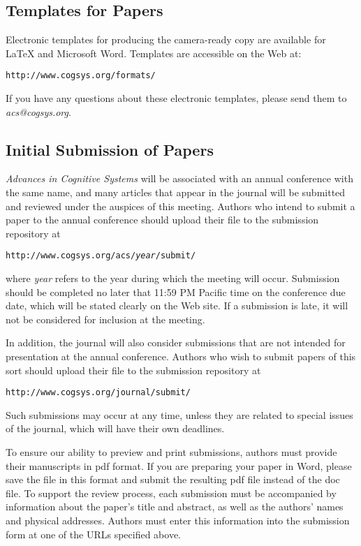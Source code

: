 \documentclass[11pt,letterpaper]{article}
\begin{document}
\subsection{Templates for Papers}

Electronic templates for producing the camera-ready copy are available
for \LaTeX\/ and Microsoft Word. Templates are accessible on the Web at: 
\vskip 0.1in
\begin{small}
\centerline{{\tt http://www.cogsys.org/formats/}}
\end{small}
\vskip 0.1in
\noindent
If you have any questions about these electronic templates, please 
send them to {\sl acs@cogsys.org}.

\subsection{Initial Submission of Papers}

{\it Advances in Cognitive Systems\/} will be associated with an 
annual conference with the same name, and many articles that 
appear in the journal will be submitted and reviewed under the
auspices of this meeting. Authors who intend to submit a paper
to the annual conference should upload their file to the submission
repository at
\vskip 0.1in
\begin{small}
\centerline{{\tt http://www.cogsys.org/acs/{\it year\/}/submit/}}
\end{small}
\vskip 0.12in
\noindent
where {\it year\/} refers to the year during which the meeting 
will occur. Submission should be completed no later that 11:59 PM 
Pacific time on the conference due date, which will be stated 
clearly on the Web site. If a submission is late, it will not
be considered for inclusion at the meeting. 

In addition, the journal will also consider submissions that are not 
intended for presentation at the annual conference. Authors who
wish to submit papers of this sort should upload their file to
the submission repository at
\vskip 0.1in
\begin{small}
\centerline{{\tt http://www.cogsys.org/journal/submit/}}
\end{small}
\vskip 0.12in
\noindent
Such submissions may occur at any time, unless they are related to 
special issues of the journal, which will have their own deadlines. 

To ensure our ability to preview and print submissions, authors must
provide their manuscripts in pdf format. If you are preparing your
paper in Word, please save the file in this format and submit the
resulting pdf file instead of the doc file.
To support the review process, each submission must be accompanied 
by information about the paper's title and abstract, as well as 
the authors' names and physical addresses. Authors must enter this
information into the submission form at one of the URLs specified 
above.
\end{document}
